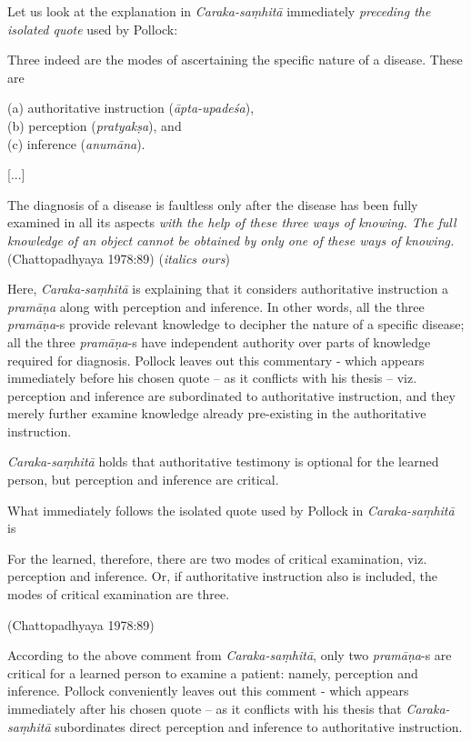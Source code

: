 Let us look at the explanation in {\sl Caraka-saṃhitā} immediately {\sl preceding the isolated quote} used by Pollock:
\begin{myquote}
Three indeed are the modes of ascertaining the specific nature of a disease. These are 

(a) authoritative instruction ({\sl āpta-upadeśa}),\\ 
(b) perception ({\sl pratyakṣa}), and\\ 
(c) inference ({\sl anumāna}).

[...]

The diagnosis of a disease is faultless only after the disease has been fully examined in all its aspects {\sl with the help of these three ways of knowing. The full knowledge of an object cannot be obtained by only one of these ways of knowing.}\hfill (Chattopadhyaya 1978:89) ({\sl italics ours})
\end{myquote}

Here, {\sl Caraka-saṃhitā} is explaining that it considers authoritative instruction a {\sl pramāṇa} along with perception and inference. In other words, all the three {\sl pramāṇa}-s provide relevant knowledge to decipher the nature of a specific disease; all the three {\sl pramāṇa}-s have independent authority over parts of knowledge required for diagnosis. Pollock leaves out this commentary - which appears immediately before his chosen quote -- as it conflicts with his thesis -- viz. perception and inference are subordinated to authoritative instruction, and they merely further examine knowledge already pre-existing in the authoritative instruction.

\newpage

{\sl Caraka-saṃhitā} holds that authoritative testimony is optional for the learned person, but perception and inference are critical.

What immediately follows the isolated quote used by Pollock in {\sl Caraka-saṃhitā} is 
\begin{myquote}
For the learned, therefore, there are two modes of critical examination, viz. perception and inference. Or, if authoritative instruction also is included, the modes of critical examination are three.

\hfill (Chattopadhyaya 1978:89)
\end{myquote}

According to the above comment from {\sl Caraka-saṃhitā}, only two {\sl pramāṇa}-s are critical for a learned person to examine a patient: namely, perception and inference. Pollock conveniently leaves out this comment - which appears immediately after his chosen quote -- as it conflicts with his thesis that {\sl Caraka-saṃhitā} subordinates direct perception and inference to authoritative instruction.  

